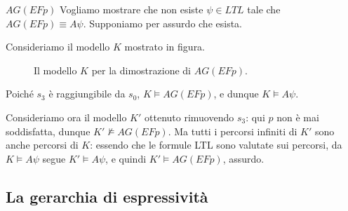 \begin{example}{\(AG(EFp)\)}
  Vogliamo mostrare che non esiste \(\psi \in LTL\) tale che \(AG(EFp) \equiv A\psi\). Supponiamo per assurdo che esista.

  Consideriamo il modello \(K\) mostrato in figura.

  \begin{figure}[H]
    \centering
    \caption{Il modello \(K\) per la dimostrazione di \(AG(EFp)\).}\label{fig:ctl-agefp-model}
  \end{figure}
   
   Poiché \(s_3\) è raggiungibile da \(s_0\), \(K \models AG(EFp)\), e dunque \(K \models A\psi\).

  Consideriamo ora il modello \(K'\) ottenuto rimuovendo \(s_3\): qui \(p\) non è mai soddisfatta, dunque \(K' \not\models AG(EFp)\). Ma tutti i percorsi infiniti di \(K'\) sono anche percorsi di \(K\): essendo che le formule LTL sono valutate sui percorsi, da \(K \models A\psi\) segue \(K' \models A\psi\), e quindi \(K' \models AG(EFp)\), assurdo.
\end{example}

\subsection{La gerarchia di espressività}

